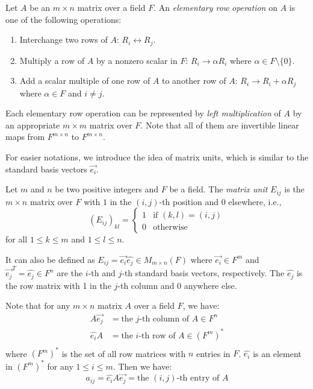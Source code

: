 \documentclass[
	11pt, %
	fleqn, %
	a4paper, %
]{LegrandOrangeBook}
\begin{document}
\begin{definition}
    Let $A$ be an $m \times n$ matrix over a field $F$. An \emph{elementary row operation} on $A$ is one of the following operations:
    \begin{enumerate}
        \item Interchange two rows of $A$: $R_i \leftrightarrow R_j$.
        \item Multiply a row of $A$ by a nonzero scalar in $F$: $R_i \to \alpha R_i$ where $\alpha \in F \setminus \{0\}$.
        \item Add a scalar multiple of one row of $A$ to another row of $A$: $R_i \to R_i + \alpha R_j$ where $\alpha \in F$ and $i \neq j$.
    \end{enumerate}
    Each elementary row operation can be represented by \emph{left multiplication} of $A$ by an appropriate $m \times m$ matrix over $F$. Note that all of them are invertible linear maps from $F^{m \times n}$ to $F^{m \times n}$.
\end{definition}

For easier notations, we introduce the idea of matrix units, which is similar to the standard basis vectors $\vec{e_i}$.

\begin{definition}
    Let $m$ and $n$ be two positive integers and $F$ be a field. The \emph{matrix unit} $E_{ij}$ is the $m \times n$ matrix over $F$ with $1$ in the $(i,j)$-th position and $0$ elsewhere, i.e.,
    \[
        (E_{ij})_{kl} = \begin{cases}
            1 & \text{if } (k,l) = (i,j) \\
            0 & \text{otherwise}
        \end{cases}
    \]
    for all $1 \leq k \leq m$ and $1 \leq l \leq n$.

    It can also be defined as $E_{ij} = \vec{e_i} \hat{e_j} \in M_{m \times n} (F)$ where $\vec{e_i} \in F^m$ and $\vec{e_j}^T = \hat{e_j} \in F^n$ are the $i$-th and $j$-th standard basis vectors, respectively. The $\hat{e_j}$ is the row matrix with 1 in the $j$-th column and 0 anywhere else.
\end{definition}

\begin{remark}
    Note that for any $m \times n$ matrix $A$ over a field $F$, we have:
    \[
        \begin{split}
            A\vec{e_j} &= \text{the } j\text{-th column of } A \in F^n \\
            \hat{e_i}A &= \text{the } i\text{-th row of } A \in (F^m)^* \\
        \end{split}
    \]
    where $(F^m)^*$ is the set of all row matrices with $n$ entries in $F$. $\hat{e_i}$ is an element in $(F^m)^*$ for any $1 \leq i \leq m$. Then we have:
    \[
        a_{ij} = \hat{e_i} A \vec{e_j} = \text{the } (i,j)\text{-th entry of } A
    \]
\end{remark}
\end{document}
